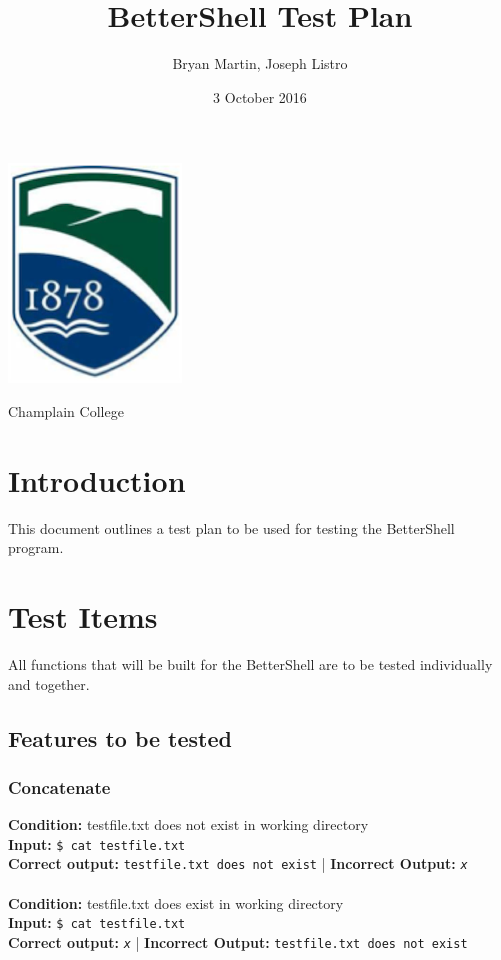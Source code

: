\documentclass[12pt, letterpaper]{article}
\begin{document}
\title{BetterShell Test Plan}
\date{3 October 2016}
\author{Bryan Martin, Joseph Listro}

\maketitle

\vspace{-15mm}

\begin{center}
{
	\vspace{20mm}
	\includegraphics[scale=2]{champlain1}
    
    Champlain College
}
\end{center}

\pagebreak
\tableofcontents
\section{Introduction}
This document outlines a test plan to be used for testing the BetterShell program.

\section{Test Items}
All functions that will be built for the BetterShell are to be tested individually and together.  

\subsection{Features to be tested}
\subsubsection{Concatenate}
\textbf{Condition:} testfile.txt does not exist in working directory \\
\textbf{Input: }  \texttt{\$ cat testfile.txt}\\
\textbf{Correct output:} \texttt{testfile.txt does not exist} | \textbf{Incorrect Output:} \texttt{\emph{x}}\\
\\
\textbf{Condition:} testfile.txt does exist in working directory \\
\textbf{Input: }  \texttt{\$ cat testfile.txt}\\
\textbf{Correct output:} \texttt{\emph{x}} | \textbf{Incorrect Output:}  \texttt{testfile.txt does not exist}
\end{document}
